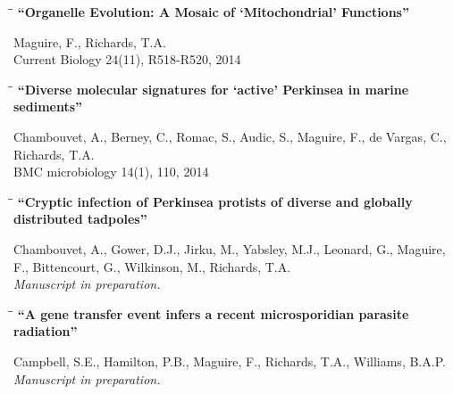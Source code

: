 \documentclass{res}
\begin{document}
\begin{resume}
\vspace{-0.2in}
\begin{tabbing}
   \hspace{2.3in}\= \hspace{2.6in}\= \kill
   {\bf ``Organelle Evolution: A Mosaic of `Mitochondrial' Functions''} 
   \end{tabbing}\vspace{-20pt}
    Maguire, F., Richards, T.A.\\ 
    Current Biology 24(11), R518-R520, 2014\\

\vspace{-0.2in}
\begin{tabbing}
   \hspace{2.3in}\= \hspace{2.6in}\= \kill
   {\bf ``Diverse molecular signatures for `active' Perkinsea in marine sediments''} 
   \end{tabbing}\vspace{-20pt}
     Chambouvet, A., Berney, C., Romac, S., Audic, S., Maguire, F., de Vargas, C., Richards, T.A.\\
     BMC microbiology 14(1), 110, 2014\\

\vspace{-0.2in}
\begin{tabbing}
   \hspace{2.3in}\= \hspace{2.6in}\= \kill
   {\bf ``Cryptic infection of Perkinsea protists of diverse and globally distributed tadpoles''}
   \end{tabbing}\vspace{-20pt}
   Chambouvet, A., Gower, D.J., Jirku, M., Yabsley, M.J., Leonard, G., Maguire, F., Bittencourt, G., Wilkinson, M., Richards, T.A.\\
\emph{Manuscript in preparation.}

\vspace{-0.1in}
\begin{tabbing}
   \hspace{2.3in}\= \hspace{2.6in}\= \kill
   {\bf ``A gene transfer event infers a recent microsporidian parasite radiation''}
   \end{tabbing}\vspace{-20pt}
Campbell, S.E., Hamilton, P.B., Maguire, F., Richards, T.A., Williams, B.A.P.\\
\emph{Manuscript in preparation.}


\end{resume}
\end{document}
